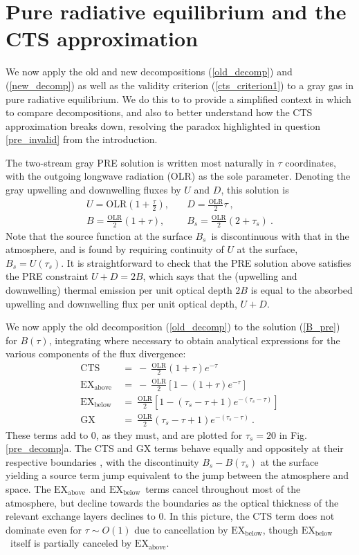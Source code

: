 \documentclass{ametsoc}
\newcommand{\beqn}{\begin{equation}}
\newcommand{\eeqn}{\end{equation}}
\newcommand{\n}{\nonumber}
\newcommand{\eqnref}[1]{(\ref{#1})}
\newcommand{\OLR}{\ensuremath{\mathrm{OLR}}}
\newcommand{\taus}{\ensuremath{\tau_s}}
\newcommand{\Bs}{\ensuremath{B_s}}
\newcommand{\GX}{\ensuremath{\mathrm{GX}}}
\newcommand{\CTS}{\ensuremath{\mathrm{CTS}}}
\newcommand{\EXbelow}{\ensuremath{\mathrm{EX_{below}}}}
\newcommand{\EXabove}{\ensuremath{\mathrm{EX_{above}}}}
\begin{document}
\section{Pure radiative equilibrium and the CTS approximation} \label{sec_pre}
We now apply the old and new decompositions \eqnref{old_decomp} and \eqnref{new_decomp} as well as the validity criterion \eqnref{cts_criterion1} to a gray gas in pure radiative equilibrium.  We do this to to provide a simplified context in which to compare decompositions, and also to better understand how the CTS approximation breaks down, resolving the paradox highlighted in question \ref{pre_invalid} from the introduction.

The two-stream gray PRE solution is written most naturally in $\tau$ coordinates, with the outgoing longwave radiation (OLR) as the sole parameter.  Denoting the gray upwelling and downwelling fluxes by $U$ and  $D$, this solution is \citep[][]{pierrehumbert2010}
	\begin{align}
		U  =  \OLR\left(1+\frac{\tau}{2}\right), & \quad D =  \frac{\OLR}{2}\tau\ , \n \\
		B  =  \frac{\OLR}{2}\left(1+\tau \right) , &\quad  \Bs= \frac{\OLR}{2}\left(2+\taus\right) \ . \label{B_pre}
	\end{align}
Note that the source function at the surface \Bs\ is discontinuous with that in the atmosphere, and is found by requiring continuity of $U$ at the surface, $\Bs = U(\taus)$. It is straightforward to check that the PRE solution above  satisfies the PRE constraint $U+D=2B$, which says that the (upwelling  and downwelling) thermal emission per unit optical depth $2B$ is equal to the absorbed upwelling and downwelling flux per unit optical depth, $U+D$. 

We now apply the old decomposition \eqnref{old_decomp} to the solution \eqnref{B_pre}  for $B(\tau)$, integrating where necessary to obtain analytical expressions for the various components of the flux divergence:
\beqn
	\begin{split}
		\CTS &\ = \ -\ \frac{\OLR}{2}(1+\tau)e^{-\tau} \\
		\EXabove   &\ =\ - \ \frac{\OLR}{2}\left[1- (1+\tau)e^{-\tau} \right] \\  
		\EXbelow  &\ =\ \frac{\OLR}{2}\left[1-(\taus-\tau+1)e^{-(\taus-\tau)} \right] \\
		\GX   &\ =\ \frac{\OLR}{2}(\taus-\tau+1)e^{-(\taus-\tau)}  \ .
	\end{split}
	\label{pre_old_decomp}
\eeqn
These terms add to 0, as they must, and are plotted for $\taus=20$ in Fig. \ref{pre_decomp}a. The CTS and GX terms behave  equally and oppositely at their respective boundaries , with the discontinuity $\Bs-B(\taus)$ at the surface  yielding a source term jump equivalent to the jump between the atmosphere and space. The \EXabove\ and \EXbelow\ terms cancel throughout most of the atmosphere, but decline towards the boundaries as the optical thickness of the relevant exchange layers declines to 0. In this picture, the CTS term does not dominate even  for $\tau \sim O(1)$ due to cancellation by \EXbelow,  though \EXbelow\ itself is partially canceled by \EXabove.
\end{document}
